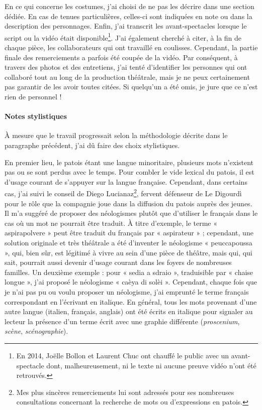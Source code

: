 En ce qui concerne les costumes, j'ai choisi de ne pas les décrire dans une section dédiée. En cas de tenues particulières, celles-ci sont indiquées en note ou dans la description des personnages.
Enfin, j'ai transcrit les avant-spectacles lorsque le script ou la vidéo était disponible\footnote{ En 2014, Jo\"elle Bollon et Laurent Chuc ont chauffé le public avec un avant-spectacle dont, malheureusement, ni le texte ni aucune preuve vidéo n'ont été retrouvés.}. J'ai également cherché à citer, à la fin de chaque pièce, les collaborateurs qui ont travaillé en coulisses. Cependant, la partie finale des remerciements a parfois été coupée de la vidéo. Par conséquent, à travers des photos et des entretiens, j'ai tenté d'identifier les personnes qui ont collaboré tout au long de la production théâtrale, mais je ne peux certainement pas garantir de les avoir toutes citées. Si quelqu'un a été omis, je jure que ce n'est rien de personnel !

\paragraph*{Notes stylistiques}
À mesure que le travail progressait selon la méthodologie décrite dans le paragraphe précédent, j'ai dû faire des choix stylistiques.

En premier lieu, le patois étant une langue minoritaire, plusieurs mots n'existent pas ou se sont perdus avec le temps. Pour combler le vide lexical du patois, il est d'usage courant de s'appuyer sur la langue française. Cependant, dans certains cas, j'ai suivi le conseil de Diego Lucianaz\footnote{ Mes plus sincères remerciements lui sont adressés pour ses nombreuses consultations concernant la recherche de mots ou d'expressions en patois.}, fervent défenseur de Le Digourdì pour le rôle que la compagnie joue dans la diffusion du patois auprès des jeunes. Il m'a suggéré de proposer des néologismes plutôt que d'utiliser le français dans le cas où un mot ne pourrait être traduit. À titre d'exemple, le terme « aspirapolvere » peut être traduit du français par « aspirateur » ; cependant, une solution originale et très théâtrale a été d'inventer le néologisme « peuccapoussa », qui, bien sûr, est légitimé à vivre au sein d'une pièce de théâtre, mais qui, qui sait, pourrait aussi devenir d'usage courant dans les foyers de nombreuses familles. Un deuxième exemple : pour « sedia a sdraio », traduisible par « chaise longue », j'ai proposé le néologisme « caèya di solèi ».
Cependant, chaque fois que je n'ai pas pu ou voulu proposer un néologisme, j'ai emprunté le terme français correspondant en l'écrivant en italique. En général, tous les mots provenant d'une autre langue (italien, français, anglais) ont été écrits en italique pour signaler au lecteur la présence d'un terme écrit avec une graphie différente (\textit{proscenium}, \textit{scène}, \textit{scénographie}).

